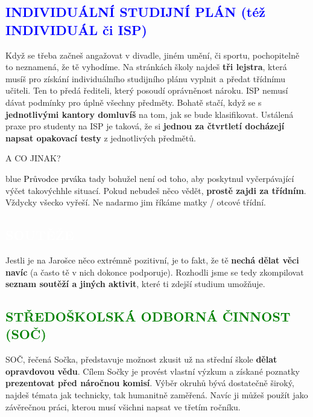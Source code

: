 \documentclass[a5paper, twoside]{article}
\newcommand{\boxik}[3]{
  \begin{tcolorbox}[
    sharp corners,
    colback = #1,
    boxrule = 0pt,
    grow to left by = 25pt,
    grow to right by = 25pt,
    right = 22pt,
    left = 22pt%
  ]
  \textcolor{#2}{#3}
  \end{tcolorbox}
}
\newcommand{\nadpis}[4]{
  \vspace*{-50pt}
  \begin{tcolorbox}[colback = #2, boxrule = 0pt, grow to left by = #4,  grow to right by = #4, arc=8pt, height = 40pt]
    \vspace*{5pt}
    \centering \section*{\textcolor{#3}{#1}}
  \end{tcolorbox}
}
\newcommand{\podnadpis}[2]{
  \subsection*{\textcolor{#2}{#1}}
}
\begin{document}
\podnadpis{INDIVIDUÁLNÍ STUDIJNÍ PLÁN (též INDIVIDUÁL či ISP)}{blue}
Když se třeba začneš angažovat v divadle, jiném umění, či sportu, pochopitelně to neznamená, že tě vyhodíme. Na stránkách školy najdeš \textbf{tři lejstra}, která musíš pro získání individuálního studijního plánu vyplnit a předat třídnímu učiteli. Ten to předá řediteli, který posoudí oprávněnost nároku.
ISP nemusí dávat podmínky pro úplně všechny předměty. Bohatě stačí, když se
s \textbf{jednotlivými kantory domluvíš} na tom, jak se bude klasifikovat. Ustálená praxe pro studenty na ISP je taková, že si \textbf{jednou za čtvrtletí docházejí napsat opakovací testy} z jednotlivých předmětů.

\boxik{blue, white, subsection*{OMLUVENÍ Z TĚLOCVIKU}
  To by jen tak nešlo. Nejdřív ti \textbf{doktor musí vydat nějaké lejstro} či potvrzení o tom, že do toho tělocviku prostě nemůžeš chodit, pak ho předáš nám a... jsi omluven. Bude tam ještě trocha papírování, ale snažíme se vycházet vstříc (nebudeme, proboha, nikoho nutit cvičit se sádrou). V prváku také podstupujeme \textbf{test plavecké zdatnosti}, kterému se nevyhneš bez uvolnění. Pokud na něj v prváku nepřijdeš, půjdeš ve druháku. Tak důslední jsme. (Pokud nepřijdeš v druháku, přijdeš ve třeťáku. Pokud nepřijdeš ve třeťáku a zvolíš si vodácký kurz, budeš zkoušky provádět na místě před všemi svými spolužáky.)}

\podnadpis{A CO JINAK?}{blue}
\textcolor{black}{\Kapitan Průvodce prváka} tady bohužel není od toho, aby poskytnul vyčerpávající výčet takovýchhle situací. Pokud nebudeš něco vědět, \textbf{prostě zajdi za třídním}. Vždycky všecko vyřeší. Ne nadarmo jim říkáme matky / otcové třídní.

\newpage

\nadpis{SOUTĚŽE}{green}{white}{-4.7cm}

\noindent Jestli je na Jarošce něco extrémně pozitivní, je to fakt, že tě \textbf{nechá dělat věci navíc} (a často tě v nich dokonce podporuje). Rozhodli jsme se tedy zkompilovat \textbf{seznam soutěží a jiných aktivit}, které ti zdejší studium umožňuje.

\podnadpis{STŘEDOŠKOLSKÁ ODBORNÁ ČINNOST (SOČ)}{green}
SOČ, řečená Sočka, představuje možnost zkusit už na střední škole \textbf{dělat opravdovou vědu}. Cílem Sočky je provést vlastní výzkum a získané poznatky \textbf{prezentovat před náročnou komisí}. Výběr okruhů bývá dostatečně široký, najdeš témata jak technicky, tak humanitně zaměřená. Navíc ji můžeš použít jako závěrečnou práci, kterou musí všichni napsat ve třetím ročníku.
\end{document}
